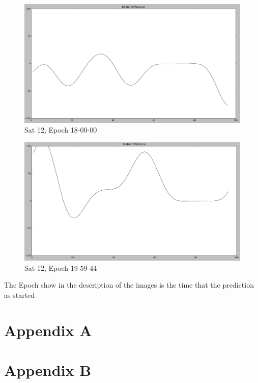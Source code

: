 \documentclass[12pt,a4paper]{article}
\begin{document}
	\begin{figure}[H]
	\centering
	\includegraphics[width=0.6\linewidth]{"images/12 - 18"}
	\caption{Sat 12, Epoch 18-00-00}
	\label{fig:12-18}
	\end{figure}
	\begin{figure}[H]
	\centering
	\includegraphics[width=0.6\linewidth]{"images/12 - 19"}
	\caption{Sat 12, Epoch 19-59-44}
	\label{fig:12-19}
	\end{figure}

	The Epoch show in the description of the images is the time that the prediction as started
	
	\newpage
	\appendix
	\section{Appendix A}
	
	\section{Appendix B}
	
		
\end{document}
